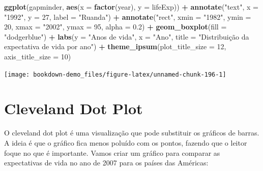\documentclass[]{book}
\newenvironment{Shaded}{\begin{snugshade}}{\end{snugshade}}
\newcommand{\KeywordTok}[1]{\textcolor[rgb]{0.13,0.29,0.53}{\textbf{#1}}}
\newcommand{\DataTypeTok}[1]{\textcolor[rgb]{0.13,0.29,0.53}{#1}}
\newcommand{\DecValTok}[1]{\textcolor[rgb]{0.00,0.00,0.81}{#1}}
\newcommand{\FloatTok}[1]{\textcolor[rgb]{0.00,0.00,0.81}{#1}}
\newcommand{\StringTok}[1]{\textcolor[rgb]{0.31,0.60,0.02}{#1}}
\newcommand{\OperatorTok}[1]{\textcolor[rgb]{0.81,0.36,0.00}{\textbf{#1}}}
\newcommand{\NormalTok}[1]{#1}
\begin{document}
\begin{Shaded}
\begin{Highlighting}[]
\KeywordTok{ggplot}\NormalTok{(gapminder, }\KeywordTok{aes}\NormalTok{(}\DataTypeTok{x =} \KeywordTok{factor}\NormalTok{(year), }\DataTypeTok{y =}\NormalTok{ lifeExp)) }\OperatorTok{+}
\StringTok{  }\KeywordTok{annotate}\NormalTok{(}\StringTok{"text"}\NormalTok{, }\DataTypeTok{x =} \StringTok{"1992"}\NormalTok{, }\DataTypeTok{y =} \DecValTok{27}\NormalTok{, }\DataTypeTok{label =} \StringTok{"Ruanda"}\NormalTok{) }\OperatorTok{+}
\StringTok{  }\KeywordTok{annotate}\NormalTok{(}\StringTok{"rect"}\NormalTok{, }\DataTypeTok{xmin =} \StringTok{"1982"}\NormalTok{, }\DataTypeTok{ymin =} \DecValTok{20}\NormalTok{,}
           \DataTypeTok{xmax =} \StringTok{"2002"}\NormalTok{, }\DataTypeTok{ymax =} \DecValTok{95}\NormalTok{, }\DataTypeTok{alpha =} \FloatTok{0.2}\NormalTok{) }\OperatorTok{+}
\StringTok{  }\KeywordTok{geom_boxplot}\NormalTok{(}\DataTypeTok{fill =} \StringTok{"dodgerblue"}\NormalTok{) }\OperatorTok{+}
\StringTok{  }\KeywordTok{labs}\NormalTok{(}\DataTypeTok{y =} \StringTok{"Anos de vida"}\NormalTok{,}
       \DataTypeTok{x =} \StringTok{"Ano"}\NormalTok{,}
       \DataTypeTok{title =} \StringTok{"Distribuição da expectativa de vida por ano"}\NormalTok{) }\OperatorTok{+}
\StringTok{  }\KeywordTok{theme_ipsum}\NormalTok{(}\DataTypeTok{plot_title_size =} \DecValTok{12}\NormalTok{,      }
              \DataTypeTok{axis_title_size =} \DecValTok{10}\NormalTok{) }
\end{Highlighting}
\end{Shaded}

\begin{center}\texttt{[image: bookdown-demo\_files/figure-latex/unnamed-chunk-196-1]} \end{center}

\section{Cleveland Dot Plot}\label{cleveland-dot-plot}

O cleveland dot plot é uma visualização que pode substituir os gráficos
de barras. A ideia é que o gráfico fica menos poluído com os pontos,
fazendo que o leitor foque no que é importante. Vamos criar um gráfico
para comparar as expectativas de vida no ano de 2007 para os países das
Américas:
\end{document}
